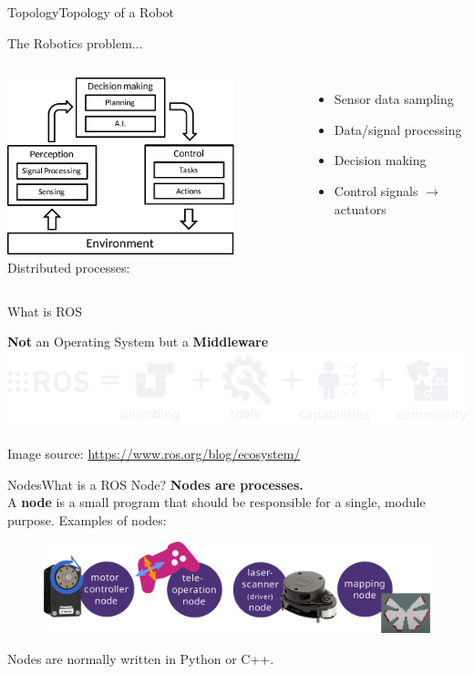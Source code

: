 \documentclass[aspectratio=169]{beamer}
\begin{document}
\begin{frame}{Topology}{Topology of a Robot}
    \begin{block}{The Robotics problem...}
      \begin{columns}
          \includegraphics[width=6.6cm]{figures/topology.pdf}
          Distributed processes:
          \begin{itemize}
            \item Sensor data sampling
            \item Data/signal processing
            \item Decision making
            \item Control signals $\rightarrow$ actuators
          \end{itemize}
      \end{columns}
    \end{block}
  \end{frame}

\begin{frame}{What is ROS}
    \begin{block}{\textbf{Not} an Operating System but a \textbf{Middleware}}
        \includegraphics[width=\textwidth]{figures/ros-equation.pdf}
    
        \hfill \tiny{Image source: \url{https://www.ros.org/blog/ecosystem/}}
      \end{block}
\end{frame}

\begin{frame}{Nodes}{What is a ROS Node?}
    \textbf{Nodes are processes.}\\
      A \textbf{node} is a small program that should be responsible for a single, module purpose. 
      Examples of nodes:    
      \begin{figure}[tbh!]
          \centering
        \includegraphics[width=.75\textwidth]{./figures/nodes.pdf}
      \end{figure}
      Nodes are normally written in Python or C++.
\end{frame}
  
\end{document}
